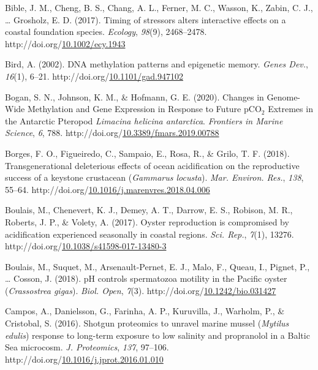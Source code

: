 \documentclass [11pt, proquest] {uwthesis}[2015/03/03]
\newlength{\cslhangindent}
\newenvironment{CSLReferences}%
{\setlength{\parindent}{0pt}%
\everypar{\setlength{\hangindent}{\cslhangindent}}\ignorespaces}%
{\par}
\begin{document}
\begin{CSLReferences}{1}{0}
\leavevmode\hypertarget{ref-Bible2017}{}%
Bible, J. M., Cheng, B. S., Chang, A. L., Ferner, M. C., Wasson, K., Zabin, C. J., \ldots{} Grosholz, E. D. (2017). {Timing of stressors alters interactive effects on a coastal foundation species}. \emph{Ecology}, \emph{98}(9), 2468--2478. http://doi.org/\href{https://doi.org/10.1002/ecy.1943}{10.1002/ecy.1943}

\leavevmode\hypertarget{ref-Bird2002}{}%
Bird, A. (2002). {DNA methylation patterns and epigenetic memory}. \emph{Genes Dev.}, \emph{16}(1), 6--21. http://doi.org/\href{https://doi.org/10.1101/gad.947102}{10.1101/gad.947102}

\leavevmode\hypertarget{ref-Bogan2020}{}%
Bogan, S. N., Johnson, K. M., \& Hofmann, G. E. (2020). {Changes in Genome-Wide Methylation and Gene Expression in Response to Future {pCO\(_2\)} Extremes in the Antarctic Pteropod \emph{Limacina helicina antarctica}}. \emph{Frontiers in Marine Science}, \emph{6}, 788. http://doi.org/\href{https://doi.org/10.3389/fmars.2019.00788}{10.3389/fmars.2019.00788}

\leavevmode\hypertarget{ref-Borges2018}{}%
Borges, F. O., Figueiredo, C., Sampaio, E., Rosa, R., \& Grilo, T. F. (2018). {Transgenerational deleterious effects of ocean acidification on the reproductive success of a keystone crustacean (\emph{Gammarus locusta})}. \emph{Mar. Environ. Res.}, \emph{138}, 55--64. http://doi.org/\href{https://doi.org/10.1016/j.marenvres.2018.04.006}{10.1016/j.marenvres.2018.04.006}

\leavevmode\hypertarget{ref-Boulais2017}{}%
Boulais, M., Chenevert, K. J., Demey, A. T., Darrow, E. S., Robison, M. R., Roberts, J. P., \& Volety, A. (2017). {Oyster reproduction is compromised by acidification experienced seasonally in coastal regions}. \emph{Sci. Rep.}, \emph{7}(1), 13276. http://doi.org/\href{https://doi.org/10.1038/s41598-017-13480-3}{10.1038/s41598-017-13480-3}

\leavevmode\hypertarget{ref-Boulais2018}{}%
Boulais, M., Suquet, M., Arsenault-Pernet, E. J., Malo, F., Queau, I., Pignet, P., \ldots{} Cosson, J. (2018). {pH controls spermatozoa motility in the Pacific oyster (\emph{Crassostrea gigas})}. \emph{Biol. Open}, \emph{7}(3). http://doi.org/\href{https://doi.org/10.1242/bio.031427}{10.1242/bio.031427}

\leavevmode\hypertarget{ref-Campos2016}{}%
Campos, A., Danielsson, G., Farinha, A. P., Kuruvilla, J., Warholm, P., \& Cristobal, S. (2016). {Shotgun proteomics to unravel marine mussel (\emph{Mytilus edulis}) response to long-term exposure to low salinity and propranolol in a Baltic Sea microcosm}. \emph{J. Proteomics}, \emph{137}, 97--106. http://doi.org/\href{https://doi.org/10.1016/j.jprot.2016.01.010}{10.1016/j.jprot.2016.01.010}


\end{CSLReferences}
\end{document}
